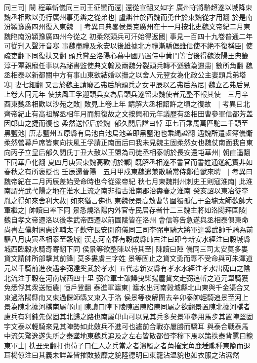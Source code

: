 同三司|{
	闕}
程華斬儀同三司王征蠻而還|{
	還從宣翻又如字}
廣州守將駱超遂以城降東魏丞相歡以勇行廣州事勇辯之從弟也|{
	盧辯仕於西魏而勇仕於東魏從才用翻}
於是南汾潁豫廣四州復入東魏　|{
	考異曰典畧侯景克廣州在十一月按北史魏文帝紀二月東魏陷南汾潁豫廣四州今從之}
初柔然頭兵可汗始得返國|{
	事見一百四十九卷普通二年可從刋入聲汗音寒}
事魏盡禮及永安以後雄據北方禮漸驕倨雖信使不絶不復稱臣|{
	使疏吏翻下同復扶又翻}
頭兵嘗至洛陽心慕中國乃置侍中黄門等官後得魏汝陽王典籖淳于覃親寵任事以為祕書監使典文翰及兩魏分裂頭兵轉不遜數為邉患|{
	數所角翻}
魏丞相泰以新都關中方有事山東欲結婚以撫之以舍人元翌女為化政公主妻頭兵弟塔寒|{
	妻七細翻}
又言於魏主請廢乙弗后納頭兵之女甲辰以乙弗后為尼|{
	魏立乙弗后見上卷大同元年}
使扶風王孚迎頭兵女為后頭兵遂留東魏使者元整不報其使　三月辛酉東魏丞相歡以沙苑之敗|{
	敗見上卷上年}
請解大丞相詔許之頃之復故　|{
	考異曰北齊帝紀止有高祖解丞相年月而無復故之文按興和元年議歷有丞相田曹參軍信都芳盖因邙山之捷而復也}
柔然送悼后於魏|{
	郁久閭后諡曰悼}
車七百乘馬萬匹駝二千頭至黑鹽池|{
	唐志鹽州五原縣有烏池白池烏池盖即黑鹽池也乘䋲證翻}
遇魏所遣鹵簿儀衛柔然營幕戶席皆東向扶風王孚請正南面后曰我未見魏主固柔然女也魏仗南面我自東向丙子立皇后郁久閭氏丁丑大赦以王盟為司徒丞相泰朝於長安還屯華州|{
	朝直遥翻下同華戶化翻}
夏四月庚寅東魏高歡朝於鄴|{
	既解丞相遂不書官而書姓通鑑紀實非如春秋之有所褒貶也}
壬辰還晉陽　五月甲戍東魏遣兼散騎常侍鄭伯猷來聘　|{
	考異曰魏帝紀在二月丙辰盖始受命時也今從梁帝紀}
秋七月東魏荆州刺史王則寇淮南|{
	此淮南謂光武弋陽之地在淮水上流之南非指古淮南郡治夀春之淮南}
癸亥詔以東冶徒李胤之得如來舍利大赦|{
	如來猶言佛也}
東魏侯景高敖曹等圍獨孤信于金墉太師歡帥大軍繼之|{
	帥讀曰率下同}
景悉燒洛陽内外官寺民居存者什二三魏主將如洛陽拜園陵|{
	魏自孝文帝遷洛以後孝武帝西遷以前園陵皆在洛州}
會信等告急遂與丞相泰俱東命尚書左僕射周惠達輔太子欽守長安開府儀同三司李弼車騎大將軍達奚武帥千騎為前驅八月庚寅丞相泰至糓城|{
	漢志河南郡有穀成縣師古注曰即今新安水經注曰穀城縣城西臨穀水騎奇寄翻下同}
侯景等欲整陳以待其至|{
	陳讀曰陣}
儀同三司太安莫多婁貸文請帥所部擊其前鋒|{
	莫多婁虜三字姓}
景等固止之貸文勇而專不受命與可朱渾道元以千騎前進夜遇李弼達奚武於孝水|{
	五代志新安縣有孝水水經注孝水出廆山之隂北流注于穀在河南城西四十里}
弼命軍士皷譟曳柴揚塵貸文走弼追斬之道元單騎獲免悉俘其衆送恒農|{
	恒戶登翻}
泰進軍瀍東|{
	瀍水出河南穀城縣北山東與千金渠合又東過洛陽縣南又東過偃師縣又東入于洛}
侯景等夜解圍去辛卯泰帥輕騎追景至河上景為陳北據河橋南屬邙山|{
	陳讀曰陣下陵陳置陳陷陳同屬之欲翻景置陳北據河橋者慮兵有利鈍先保固其北歸之路也南屬邙山可以見其兵多矣景軍參用馬步其置陣堅固宇文泰以輕騎來見其陣勢如此斂兵不進可也遽前合戰亦屢勝而驕耳}
與泰合戰泰馬中流矢驚逸遂失所之泰墜地東魏兵追及之左右皆散都督李穆下馬以策抶泰背罵曰籠東軍士|{
	抶丑栗翻打也荀子曰仁人之兵當之者潰觸之者角摧案角鹿埵隴種東籠而退耳楊倞注曰其義未詳盖皆摧敗披靡之貌陸德明曰東籠沾温貌也如衣服之沾濕然}
